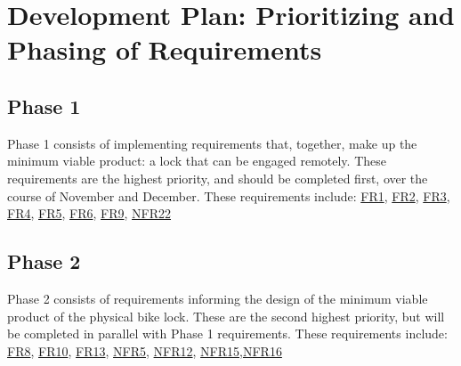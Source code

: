 \documentclass[12pt]{article}
\begin{document}



\section{Development Plan: Prioritizing and Phasing of Requirements}


\subsection{Phase 1}
Phase 1 consists of implementing requirements that, together, make up the minimum viable product: a lock that can be engaged remotely. These requirements are the highest priority, and should be completed first, over the course of November and December. These requirements include:
\hyperref[FR1]{FR1}, \hyperref[FR2]{FR2}, \hyperref[FR3]{FR3}, \hyperref[FR4]{FR4}, \hyperref[FR5]{FR5}, \hyperref[FR6]{FR6}, \hyperref[FR9]{FR9}, \hyperref[NFR22]{NFR22}

\subsection{Phase 2}
Phase 2 consists of requirements informing the design of the minimum viable product of the physical bike lock. These are the second highest priority, but will be completed in parallel with Phase 1 requirements. These requirements include:
\hyperref[FR8]{FR8}, \hyperref[FR10]{FR10}, \hyperref[FR13]{FR13}, \hyperref[NFR5]{NFR5}, \hyperref[NFR12]{NFR12}, \hyperref[NFR15]{NFR15},\hyperref[NFR16]{NFR16}
\end{document}
